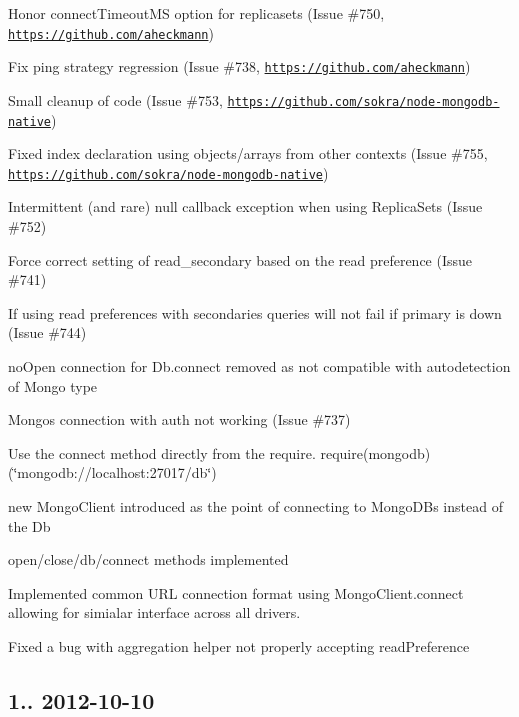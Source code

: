 \begin{DoxyItemize}
\item Honor connect\+Timeout\+MS option for replicasets (Issue \#750, \href{https://github.com/aheckmann}{\tt https\+://github.\+com/aheckmann})
\item Fix ping strategy regression (Issue \#738, \href{https://github.com/aheckmann}{\tt https\+://github.\+com/aheckmann})
\item Small cleanup of code (Issue \#753, \href{https://github.com/sokra/node-mongodb-native}{\tt https\+://github.\+com/sokra/node-\/mongodb-\/native})
\item Fixed index declaration using objects/arrays from other contexts (Issue \#755, \href{https://github.com/sokra/node-mongodb-native}{\tt https\+://github.\+com/sokra/node-\/mongodb-\/native})
\item Intermittent (and rare) null callback exception when using Replica\+Sets (Issue \#752)
\item Force correct setting of read\+\_\+secondary based on the read preference (Issue \#741)
\item If using read preferences with secondaries queries will not fail if primary is down (Issue \#744)
\item no\+Open connection for Db.\+connect removed as not compatible with autodetection of Mongo type
\item Mongos connection with auth not working (Issue \#737)
\item Use the connect method directly from the require. require(\textquotesingle{}mongodb\textquotesingle{})(\char`\"{}mongodb\+://localhost\+:27017/db\char`\"{})
\item new Mongo\+Client introduced as the point of connecting to Mongo\+DB\textquotesingle{}s instead of the Db
\begin{DoxyItemize}
\item open/close/db/connect methods implemented
\end{DoxyItemize}
\item Implemented common U\+RL connection format using Mongo\+Client.\+connect allowing for simialar interface across all drivers.
\item Fixed a bug with aggregation helper not properly accepting read\+Preference
\end{DoxyItemize}

\subsection*{1.. 2012-\/10-\/10 }


